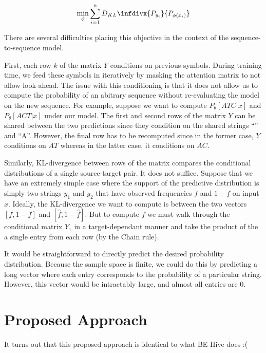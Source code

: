 \documentclass[12pt]{article}
\newcommand{\kld}[2]{\ensuremath{D_{KL}\infdivx{#1}{#2}}\xspace}
\begin{document}
$$\min_{\phi}\sum_{i=1}^n\kld{P_{y_i}}{P_{\phi(x_i)}}$$

There are several difficulties placing this objective in the context
of the sequence-to-sequence model.

First, each row $k$ of the matrix $Y$ conditions on previous
symbols. During training time, we feed these symbols in iteratively by
masking the attention matrix to not allow look-ahead. The issue with
this conditioning is that it does not allow us to compute the
probability of an abitrary sequence without re-evaluating the model on
the new sequence. For example, suppose we want to compute
$P_\theta[ATC | x]$ and $P_\theta[ACT | x]$ under our model. The first
and second rows of the matrix $Y$ can be shared between the two
predictions since they condition on the shared strings ``'' and
``A''. However, the final row has to be recomputed since in the former
case, $Y$ conditions on $AT$ whereas in the latter case, it conditions
on $AC$.

Similarly, KL-divergence between rows of the matrix compares the
conditional distributions of a single source-target pair. It does not
suffice. Suppose that we have an extremely simple case where the
support of the predictive distribution is simply two strings $y_1$ and
$y_2$ that have observed frequencies $f$ and $1-f$ on input
$x$. Ideally, the KL-divergence we want to compute is between the two
vectors $[f, 1-f]$ and $[\hat{f}, 1-\hat{f}]$. But to compute $f$ we
must walk through the conditional matrix $Y_1$ in a target-dependant
manner and take the product of the a single entry from each row (by
the Chain rule).

It would be straightforward to directly predict the desired
probability distribution. Because the sample space is finite, we could
do this by predicting a long vector where each entry corresponds to
the probability of a particular string. However, this vector would be
intractably large, and almost all entries are 0.

\section*{Proposed Approach}


It turns out that this proposed approach is identical to what BE-Hive
does :( 
\end{document}

